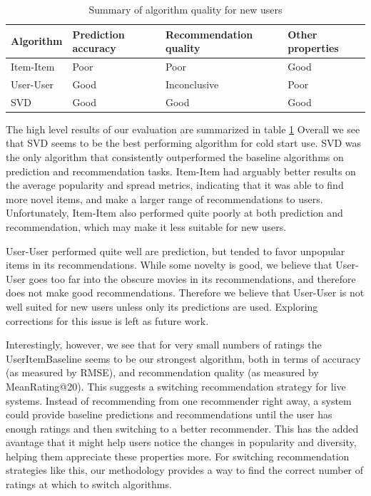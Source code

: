 \documentclass[letterpaper]{sig-alternate}
\begin{document}
  \begin{table}[ht!]
    \centering
    \begin{tabular}{|p{4.5em}|p{4.5em}|p{7.5em}|p{4.5em}|}
      \hline
      Algorithm & Prediction accuracy & Recommendation quality      & Other properties \\\hline
      Item-Item  & Poor                & Poor                        & Good             \\\hline
      User-User  & Good                & Inconclusive                & Poor             \\\hline
      SVD       & Good                & Good                        & Good             \\\hline
    \end{tabular}
    \caption{Summary of algorithm quality for new users}
    \label{tbl:results}
  \end{table}

  The high level results of our evaluation are summarized in table \ref{tbl:results}
  Overall we see that SVD seems to be the best performing algorithm for cold start use.
  SVD was the only algorithm that consistently outperformed the baseline algorithms on prediction and recommendation tasks.
  Item-Item had arguably better results on the average popularity and spread metrics, indicating that it was able to find more novel items, and make a larger range of recommendations to users.
  Unfortunately, Item-Item also performed quite poorly at both prediction and recommendation, which may make it less suitable for new users.

  User-User performed quite well are prediction, but tended to favor unpopular items in its recommendations.
  While some novelty is good, we believe that User-User goes too far into the obscure movies in its recommendations, and therefore does not make good recommendations.
  Therefore we believe that User-User is not well suited for new users unless only its predictions are used.
  Exploring corrections for this issue is left as future work.


  Interestingly, however, we see that for very small numbers of ratings the UserItemBaseline seems to be our strongest algorithm, both in terms of accuracy (as measured by RMSE), and recommendation quality (as measured by MeanRating@20).
  This suggests a switching recommendation strategy for live systems.
  Instead of recommending from one recommender right away, a system could provide baseline predictions and recommendations until the user has enough ratings and then switching to a better recommender.
  This has the added avantage that it might help users notice the changes in popularity and diversity, helping them appreciate these properties more.
  For switching recommendation strategies like this, our methodology provides a way to find the correct number of ratings at which to switch algorithms.
\end{document}
